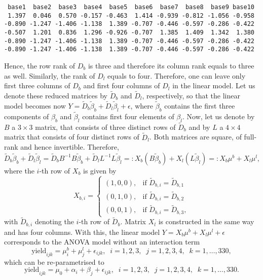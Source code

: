 \documentclass[12pt]{article}
\begin{document}
\begin{verbatim}
 base1  base2  base3  base4  base5  base6  base7  base8  base9 base10
 1.397  0.046  0.570 -0.157 -0.463  1.414 -0.939 -0.812 -1.056 -0.958
-0.890 -1.247 -1.406 -1.138  1.389 -0.707 -0.446 -0.597 -0.286 -0.422
-0.507  1.201  0.836  1.296 -0.926 -0.707  1.385  1.409  1.342  1.380
-0.890 -1.247 -1.406 -1.138  1.389 -0.707 -0.446 -0.597 -0.286 -0.422
-0.890 -1.247 -1.406 -1.138  1.389 -0.707 -0.446 -0.597 -0.286 -0.422
\end{verbatim}
Hence, the row rank of $D_b$ is three and therefore its column rank equals to three as well. Similarly, the rank of $D_l$ equals to four. Therefore, one can leave only first three columns of $D_b$ and first four columns of $D_l$ in the linear model. Let us denote these reduced matrices by $\widetilde{D}_b$ and $\widetilde{D}_l$, respectively, so that the linear model becomes now $Y=\widetilde{D}_b\widetilde{\beta}_b+\widetilde{D}_l\widetilde\beta_l+\epsilon$, where $\widetilde\beta_b$ contains the first three components of $\beta_b$ and $\widetilde\beta_l$ contains first four elements of $\beta_l$. Now, let us denote by $B$ a $3\times 3$ matrix, that consists of three distinct rows of $\widetilde{D}_b$ and by $L$ a $4\times 4$ matrix that consists of four distinct rows of $\widetilde{D}_l$. Both matrices are square, of full-rank and hence invertible. Therefore, 
$$
\widetilde{D}_b\widetilde{\beta}_b+\widetilde{D}_l\widetilde\beta_l=\widetilde{D}_bB^{-1}B\widetilde{\beta}_b+\widetilde{D}_lL^{-1}L\widetilde\beta_l=:X_b(B\widetilde\beta_b)+X_l(L\widetilde\beta_l)=:X_b\mu^b+X_l\mu^l,
$$
where the $i$-th row of $X_b$ is given by 
$$
X_{b,i}=\begin{cases}
	(1,0,0),&\mbox{if }\widetilde{D}_{b,i}=\widetilde{D}_{b,1}\\
	(0,1,0),&\mbox{if }\widetilde{D}_{b,i}=\widetilde{D}_{b,2}\\
	(0,0,1),&\mbox{if }\widetilde{D}_{b,i}=\widetilde{D}_{b,3},
\end{cases}
$$
with $\widetilde{D}_{b,i}$ denoting the $i$-th row of $\widetilde{D}_b$. Matrix $X_l$ is constructed in the same way and has four columns. With this, the linear model $Y=X_b\mu^b+X_l\mu^l+\epsilon$ corresponds to the ANOVA model without an interaction term
$$
\mbox{yield}_{ijk}=\mu^b_i+\mu^l_j+\epsilon_{ijk},\;\; i=1,2,3,\;\;j=1,2,3,4,\;\;k=1,\ldots,330,
$$
which can be re-parametrised to
$$
\mbox{yield}_{ijk}=\mu_0+\alpha_i+\beta_j+\epsilon_{ijk},\;\; i=1,2,3,\;\;j=1,2,3,4,\;\;k=1,\ldots,330.
$$
\end{document}

